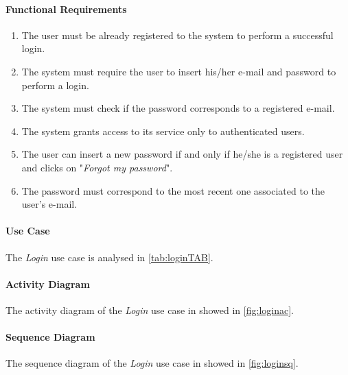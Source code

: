 \paragraph*{Functional Requirements}
\begin{enumerate}[label=R.\arabic*:,resume]
	\item The user must be already registered to the system to perform a successful login.
	\item The system must require the user to insert his/her e-mail and password to perform a login.
	\item The system must check if the password corresponds to a registered e-mail.
	\item The system grants access to its service only to authenticated users.
	\item The user can insert a new password if and only if he/she is a registered user and clicks on "\emph{Forgot my password}".
	\item The password must correspond to the most recent one associated to the user's e-mail.
\end{enumerate}

\paragraph*{Use Case\\}
The \emph{Login} use case is analysed in \autoref{tab:loginTAB}.
\paragraph*{Activity Diagram\\}
The activity diagram of the \emph{Login} use case in showed in \autoref{fig:loginac}.
\paragraph*{Sequence Diagram\\}
The sequence diagram of the \emph{Login} use case in showed in \autoref{fig:loginsq}.

